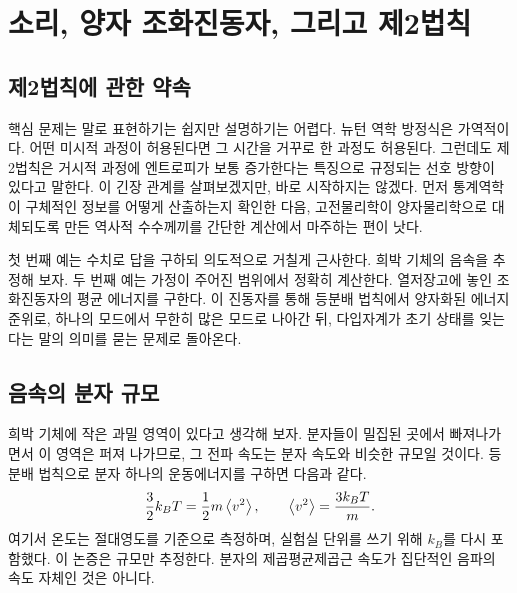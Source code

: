 \chapter{소리, 양자 조화진동자, 그리고 제2법칙}


\section{제2법칙에 관한 약속}

핵심 문제는 말로 표현하기는 쉽지만 설명하기는 어렵다. 뉴턴 역학 방정식은 가역적이다. 어떤 미시적 과정이 허용된다면 그 시간을 거꾸로 한 과정도 허용된다. 그런데도 제2법칙은 거시적 과정에 엔트로피가 보통 증가한다는 특징으로 규정되는 선호 방향이 있다고 말한다. 이 긴장 관계를 살펴보겠지만, 바로 시작하지는 않겠다. 먼저 통계역학이 구체적인 정보를 어떻게 산출하는지 확인한 다음, 고전물리학이 양자물리학으로 대체되도록 만든 역사적 수수께끼를 간단한 계산에서 마주하는 편이 낫다.

첫 번째 예는 수치로 답을 구하되 의도적으로 거칠게 근사한다. 희박 기체의 음속을 추정해 보자. 두 번째 예는 가정이 주어진 범위에서 정확히 계산한다. 열저장고에 놓인 조화진동자의 평균 에너지를 구한다. 이 진동자를 통해 등분배 법칙에서 양자화된 에너지 준위로, 하나의 모드에서 무한히 많은 모드로 나아간 뒤, 다입자계가 초기 상태를 잊는다는 말의 의미를 묻는 문제로 돌아온다.

\section{음속의 분자 규모}

희박 기체에 작은 과밀 영역이 있다고 생각해 보자. 분자들이 밀집된 곳에서 빠져나가면서 이 영역은 퍼져 나가므로, 그 전파 속도는 분자 속도와 비슷한 규모일 것이다. 등분배 법칙으로 분자 하나의 운동에너지를 구하면 다음과 같다.
\begin{equation}
 \frac{3}{2}k_B T
 =\frac{1}{2}m\left\langle v^2\right\rangle,
 \qquad
 \left\langle v^2\right\rangle=\frac{3k_B T}{m}.
 \label{eq:sm7-molecular-speed}
\end{equation}
여기서 온도는 절대영도를 기준으로 측정하며, 실험실 단위를 쓰기 위해 \(k_B\)를 다시 포함했다. 이 논증은 규모만 추정한다. 분자의 제곱평균제곱근 속도가 집단적인 음파의 속도 자체인 것은 아니다.

